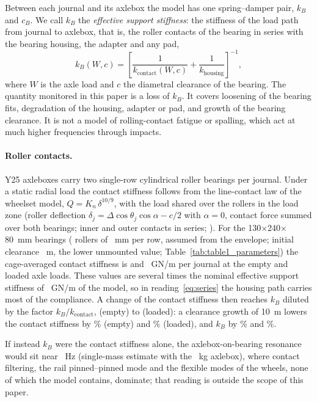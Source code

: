 Between each journal and its axlebox the model has one spring--damper pair, $k_B$ and $c_B$. We call
$k_B$ the \emph{effective support stiffness}: the stiffness of the load path from journal to axlebox,
that is, the roller contacts of the bearing in series with the bearing housing, the adapter and any
pad,
\begin{equation}
  k_B(W, c) = \left[\frac{1}{k_\mathrm{contact}(W, c)} + \frac{1}{k_\mathrm{housing}}\right]^{-1},
  \label{eq:series}
\end{equation}
where $W$ is the axle load and $c$ the diametral clearance of the bearing. The quantity monitored in
this paper is a loss of $k_B$. It covers loosening of the bearing fits, degradation of the housing,
adapter or pad, and growth of the bearing clearance. It is not a model of rolling-contact fatigue
or spalling, which act at much higher frequencies through impacts.

\paragraph{Roller contacts.} Y25 axleboxes carry two single-row cylindrical roller bearings per
journal. Under a static radial load the contact stiffness follows from the line-contact law of the
wheelset model, $Q = K_n\,\delta^{10/9}$, with the load shared over the rollers in the load zone
(roller deflection $\delta_j = \Delta\cos\theta_j\cos\alpha - c/2$ with $\alpha = 0$, contact force
summed over both bearings; inner and outer contacts in series; \citealp{harris2006}). For the
130$\times$240$\times$80~mm bearings (\RollersPerRow{} rollers of \RollerLength~mm per row, assumed
from the envelope; initial clearance \ClearanceZero~\textmu m, the lower unmounted value;
Table~\ref{tab:table1_parameters}) the cage-averaged contact stiffness is
\KcontactEmpty{} and \KcontactLoaded{}~GN/m per journal at the empty and loaded axle loads.
These values are several times the nominal effective support stiffness of \kBnom~GN/m of the
model, so in reading~\eqref{eq:series} the housing path carries most of the compliance.
A change of the contact stiffness then reaches $k_B$ diluted by the factor $k_B/k_\mathrm{contact}$,
\DilutionEmpty{} (empty) to \DilutionLoaded{} (loaded): a clearance growth of 10~\textmu m lowers the
contact stiffness by \ContactPctTenEmpty\% (empty) and \ContactPctTenLoaded\% (loaded), and $k_B$ by
\EffPctTenEmpty\% and \EffPctTenLoaded\%.

If instead $k_B$ were the contact stiffness alone, the axlebox-on-bearing resonance would sit near
\AxleboxModeContactHz~Hz (single-mass estimate with the \AxleboxMass~kg axlebox), where contact
filtering, the rail pinned--pinned mode and the flexible modes of the wheels, none of which the
model contains, dominate; that reading is outside the scope of this paper.

